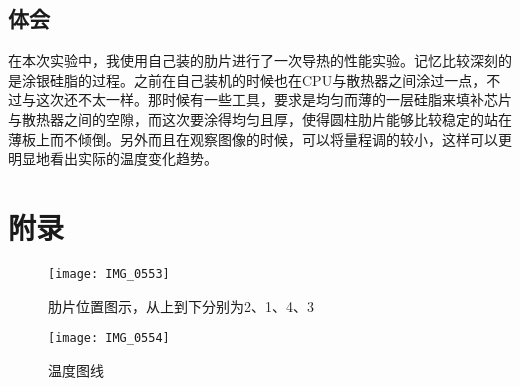 \documentclass[UTF8,a4paper,10pt]{ctexart}
\begin{document}
	\subsection{体会}
	在本次实验中，我使用自己装的肋片进行了一次导热的性能实验。记忆比较深刻的是涂银硅脂的过程。之前在自己装机的时候也在CPU与散热器之间涂过一点，不过与这次还不太一样。那时候有一些工具，要求是均匀而薄的一层硅脂来填补芯片与散热器之间的空隙，而这次要涂得均匀且厚，使得圆柱肋片能够比较稳定的站在薄板上而不倾倒。另外而且在观察图像的时候，可以将量程调的较小，这样可以更明显地看出实际的温度变化趋势。
	\section{附录}
	\begin{figure}[h]
		\centering
		\texttt{[image: IMG\_0553]}
		\caption{肋片位置图示，从上到下分别为2、1、4、3}
		\label{fig:img0553}
	\end{figure}
	\begin{figure}[h]
		\centering
		\texttt{[image: IMG\_0554]}
		\caption{温度图线}
		\label{fig:img0554}
	\end{figure}
	
\end{document}
